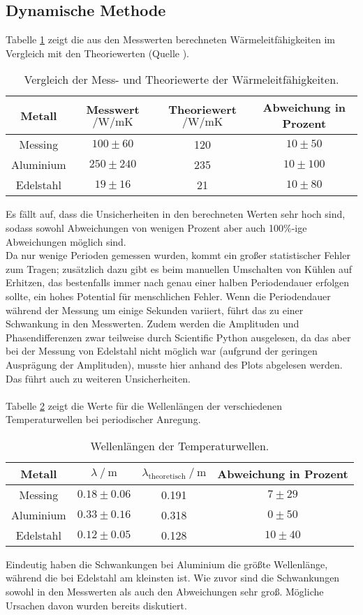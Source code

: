 \subsection{Dynamische Methode}
Tabelle \ref{tab:vergleich} zeigt die aus den Messwerten berechneten Wärmeleitfähigkeiten im Vergleich mit den Theoriewerten (Quelle \cite{litval}).
\begin{table}
    \centering
    \caption{Vergleich der Mess- und Theoriewerte der Wärmeleitfähigkeiten.}
    \label{tab:vergleich}
    \begin{tabular}{c c c c}
        \toprule
        Metall & Messwert$\mathbin{/} \si{\watt\per\m\kelvin}$ & Theoriewert$\mathbin{/} \si{\watt\per\m\kelvin}$ & Abweichung in Prozent \\
        \midrule
        Messing & $100 \pm 60 $ & 120 & $10 \pm 50$\\
        Aluminium & $250 \pm 240$ & 235 & $10 \pm 100$\\
        Edelstahl & $19 \pm 16$& 21 & $10 \pm 80$\\
        \bottomrule
    \end{tabular}
\end{table}

\noindent Es fällt auf, dass die Unsicherheiten in den berechneten Werten sehr hoch sind, sodass sowohl Abweichungen von wenigen Prozent aber auch 100$\%$-ige Abweichungen möglich sind.\\
Da nur wenige Perioden gemessen wurden, kommt ein großer statistischer Fehler zum Tragen; zusätzlich dazu gibt es beim manuellen Umschalten von Kühlen auf Erhitzen, das bestenfalls immer nach
genau einer halben Periodendauer erfolgen sollte, ein hohes Potential für menschlichen Fehler. Wenn die Periodendauer während der Messung um einige Sekunden variiert, führt das zu einer Schwankung
in den Messwerten. Zudem werden die Amplituden und Phasendifferenzen zwar teilweise durch Scientific Python ausgelesen, da das aber bei der Messung von Edelstahl nicht möglich 
war (aufgrund der geringen Ausprägung der Amplituden), musste hier anhand des Plots abgelesen werden. Das führt auch zu weiteren Unsicherheiten. \\%
\\

Tabelle \ref{tab:die} zeigt die Werte für die Wellenlängen der verschiedenen Temperaturwellen bei periodischer Anregung.

\begin{table}
    \centering
    \caption{Wellenlängen der Temperaturwellen.}
    \label{tab:die}
    \begin{tabular}{c c c c}
        \toprule
        Metall & $\lambda \mathbin{/} \si{\m}$ & $\lambda_{\text{theoretisch}} \mathbin{/} \si{\m}$ & Abweichung in Prozent \\
        \midrule
        Messing & $0.18 \pm 0.06$ & 0.191 & $7 \pm 29$\\
        Aluminium & $0.33 \pm 0.16$ & 0.318 & $0 \pm 50$\\
        Edelstahl & $0.12 \pm 0.05$ & 0.128 & $10 \pm 40$\\
        \bottomrule
    \end{tabular}
\end{table}

Eindeutig haben die Schwankungen bei Aluminium die größte Wellenlänge, während die bei Edelstahl am kleinsten ist. Wie zuvor sind die Schwankungen sowohl in den Messwerten als auch den Abweichungen
sehr groß. Mögliche Ursachen davon wurden bereits diskutiert.